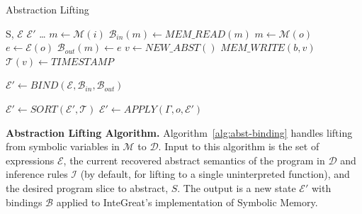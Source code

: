 \renewcommand{\algorithmicrequire}{\textbf{Input:}}
\renewcommand{\algorithmicensure}{\textbf{Output:}}

\begin{algorithm}
    \caption{Abstraction Lifting}
    \begin{algorithmic}[1]
        \footnotesize
	\Require S, $\mathcal{E}$
        \Ensure $\mathcal{E}'$
        \State \ldots {}
         
        \State $m \leftarrow \mathcal{M}(i)$
        \State $\mathcal{B}_{in}(m) \leftarrow MEM\_READ(m)$ 
        \EndFor
         
        \State $m \leftarrow \mathcal{M}(o)$
        \State $e \leftarrow \mathcal{E}(o)$
        \State $\mathcal{B}_{out}(m) \leftarrow e$
        \EndFor
        \State $v \leftarrow NEW\_ABST()$
        \State $MEM\_WRITE(b, v)$ 
        \State $\mathcal{T}(v) \leftarrow TIMESTAMP$
        \EndFor

    \State $\mathcal{E}' \leftarrow BIND(\mathcal{E}, \mathcal{B}_{in}, \mathcal{B}_{out})$

        \State $\mathcal{E}' \leftarrow SORT(\mathcal{E}', \mathcal{T})$
	    \State $\mathcal{E}' \leftarrow APPLY(\Gamma, o, \mathcal{E}')$
        \EndFor
    \end{algorithmic}
    \label{alg:abst-binding}
\end{algorithm}

\textbf{Abstraction Lifting Algorithm.}
\label{sec:algorithms}
Algorithm~\ref{alg:abst-binding} handles lifting from symbolic variables in $\mathcal{M}$ to $\mathcal{D}$.
 Input to this algorithm is the set of expressions $\mathcal{E}$, the current recovered abstract semantics of the program in $\mathcal{D}$ and inference rules $\mathcal{I}$ (by default, for lifting to a single uninterpreted function), and the desired program slice to abstract, $S$.
 The output is a new state $\mathcal{E}'$ with bindings $\mathcal{B}$ applied to InteGreat's implementation of Symbolic Memory.

